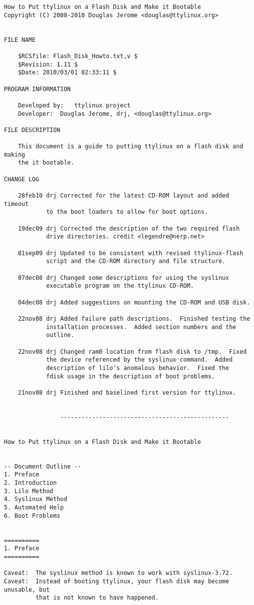 \documentclass[10pt]{article}
\begin{document}
\begin{lstlisting}
How to Put ttylinux on a Flash Disk and Make it Bootable
Copyright (C) 2008-2010 Douglas Jerome <douglas@ttylinux.org>


FILE NAME

	$RCSfile: Flash_Disk_Howto.txt,v $
	$Revision: 1.11 $
	$Date: 2010/03/01 02:33:11 $

PROGRAM INFORMATION

	Developed by:	ttylinux project
	Developer:	Douglas Jerome, drj, <douglas@ttylinux.org>

FILE DESCRIPTION

	This document is a guide to putting ttylinux on a flash disk and making
	the it bootable.

CHANGE LOG

	28feb10	drj	Corrected for the latest CD-ROM layout and added timeout
			to the boot loaders to allow for boot options.

	19dec09	drj	Corrected the description of the two required flash
			drive directories. credit <legendre@nerp.net>

	01sep09	drj	Updated to be consistent with revised ttylinux-flash
			script and the CD-ROM directory and file structure.

	07dec08	drj	Changed some descriptions for using the syslinux
			executable program on the ttylinux CD-ROM.

	04dec08	drj	Added suggestions on mounting the CD-ROM and USB disk.

	22nov08	drj	Added failure path descriptions.  Finished testing the
			installation processes.  Added section numbers and the
			outline.

	22nov08	drj	Changed ram0 location from flash disk to /tmp.  Fixed
			the device referenced by the syslinux command.  Added
			description of lilo's anomalous behavior.  Fixed the
			fdisk usage in the description of boot problems.

	21nov08	drj	Finished and baselined first version for ttylinux.


                ------------------------------------------------


How to Put ttylinux on a Flash Disk and Make it Bootable


-- Document Outline --
1. Preface
2. Introduction
3. Lilo Method
4. Syslinux Method
5. Automated Help
6. Boot Problems


==========
1. Preface
==========

Caveat:  The syslinux method is known to work with syslinux-3.72.
Caveat:  Instead of booting ttylinux, your flash disk may become unusable, but
         that is not known to have happened.


\end{lstlisting}
\end{document}
